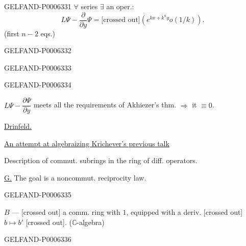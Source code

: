 \begin{GelfandAdjacentEvidence}{GELFAND-P000633}{1}
\(\forall\) series \(\exists\) an oper.:
\[
L\Psi-\frac{\partial}{\partial y}\Psi=
\text{[crossed out]}\left(e^{kx+k^ny}o(1/k)\right).
\]
(first \(n-2\) eqs.)
\end{GelfandAdjacentEvidence}
\begin{GelfandAdjacentEvidence}{GELFAND-P000633}{2}

\end{GelfandAdjacentEvidence}
\begin{GelfandAdjacentEvidence}{GELFAND-P000633}{3}

\end{GelfandAdjacentEvidence}
\begin{GelfandAdjacentEvidence}{GELFAND-P000633}{4}


\(L\Psi-\dfrac{\partial\Psi}{\partial y}\)
meets all the requirements of Akhiezer’s thm. \(\Rightarrow\) it \(\equiv0\).

\underline{Drinfeld.}

\underline{An attempt at algebraizing Krichever’s previous talk}

Description of commut. subrings in the ring of diff. operators.

\underline{G.} The goal is a noncommut. reciprocity law.
\end{GelfandAdjacentEvidence}
\begin{GelfandAdjacentEvidence}{GELFAND-P000633}{5}


\(B\) --- [crossed out] a comm. ring with \(1\), equipped with a deriv.
[crossed out] \(b\mapsto b'\) [crossed out].
(\(\mathbb C\)-algebra)
\end{GelfandAdjacentEvidence}
\begin{GelfandAdjacentEvidence}{GELFAND-P000633}{6}

\end{GelfandAdjacentEvidence}
